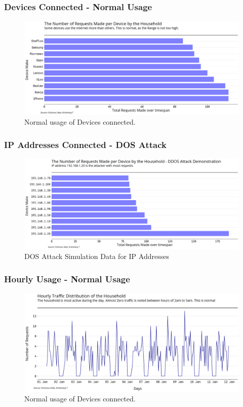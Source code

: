 \documentclass[11pt]{article}
\begin{document}
\subsubsection{Devices Connected - Normal Usage}
\begin{figure}[H]
    \centering
    \includegraphics[width=.95\textwidth]{router_log_analysis_graphs/normal_devices_usage.png}
    \caption{Normal usage of Devices connected. }
\end{figure}



\subsubsection{IP Addresses Connected - DOS Attack}
\begin{figure}[H]
    \centering
    \includegraphics[width=.95\textwidth]{router_log_analysis_graphs/ddos_attack_ips.png}
    \caption{DOS Attack Simulation Data for IP Addresses}
\end{figure}



\subsubsection{Hourly Usage - Normal Usage}
\begin{figure}[H]
    \centering
    \includegraphics[width=.95\textwidth]{router_log_analysis_graphs/normal_hourly_usage.png}
    \caption{Normal usage of Devices connected. }
\end{figure}
\end{document}
